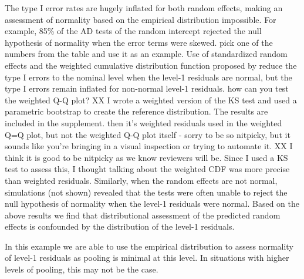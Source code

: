 \documentclass[12pt]{article} %
\newcommand{\hh}[1]{{\color{orange} #1}}
\newcommand{\al}[1]{{\color{red} #1}}
\begin{document}
The type I error rates are hugely inflated for both random effects, making an assessment of normality based on the empirical distribution impossible. 
\al{For example, 85\% of the AD tests of the random intercept rejected the null hypothesis of normality when the error terms were skewed.}
\hh{pick one of the numbers from the table and use it as an example.} Use of standardized random effects and \al{the weighted cumulative distribution function proposed by \cite{Lange:1989uu}} reduce the type I errors to the nominal level when the level-1 residuals are normal, but the type I errors remain inflated for non-normal level-1 residuals. 
\hh{how can you test the weighted Q-Q plot?} \al{XX I wrote a weighted version of the KS test and used a parametric bootstrap to create the reference distribution. The results are included in the supplement.} \hh{then it's weighted residuals used in the weighted Q=Q plot, but not the weighted Q-Q plot itself - sorry to be so nitpicky, but it sounds like you're bringing in a visual inspection or trying to automate it.  }  \al{XX I think it is good to be nitpicky as we know reviewers will be. Since I used a KS test to assess this, I thought talking about the weighted CDF was more precise than weighted residuals.}
Similarly, when the random effects are not normal, simulations (not shown) revealed that the tests were  often unable to reject the null hypothesis of normality when the level-1 residuals were normal. \al{Based on the above results we find that distributional assessment of the predicted random effects is confounded by the distribution of the level-1 residuals.}


In this example we are able to use the empirical distribution to assess normality of  level-1 residuals  as  pooling is minimal at this level. In situations with higher levels of pooling, this may not be the case.
\end{document}
